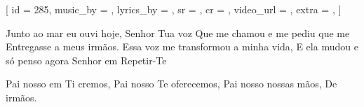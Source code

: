[
    id          = {285},
    music_by    = {},
    lyrics_by   = {},
    sr          = {},
    cr          = {},
    video_url   = {},
    extra       = {},
]

\beginverse
Junto ao mar eu ouvi hoje, Senhor Tua voz
Que me chamou e me pediu que me
Entregasse a meus irmãos.
Essa voz me transformou a minha vida,
E ela mudou e só penso agora Senhor em
Repetir-Te
\endverse

\beginchorus
Pai nosso em Ti cremos,
Pai nosso Te oferecemos,
Pai nosso nossas mãos,
De irmãos.
\endchorus

\endsong
